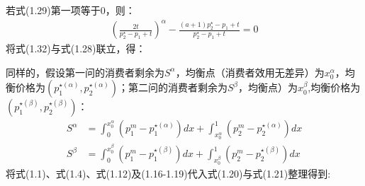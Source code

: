 若式(1.29)第一项等于0，则：
\begin{align}
    (\frac{2t}{p_2^{\star}-p_1+t})^{\alpha}-\frac{(a+1)p_2^{\star}-p_1+t}{p_2^{\star}-p_1+t} = 0
\end{align}
将式(1.32)与式(1.28)联立，得：



同样的，假设第一问的消费者剩余为$S^{\alpha}$，均衡点（消费者效用无差异）为$x_0^{\alpha}$，均衡价格为$(p_1^{\star(\alpha)},p_2^{\star(\alpha)})$；第二问的消费者剩余为$S^{\beta}$，均衡点）为$x_0^{\beta}$,均衡价格为$(p_1^{\star(\beta)},p_2^{\star(\beta)})$：
\begin{align}
    S^{\alpha} &= \int_0^{x_0^{\alpha}}(p_1^m-p_1^{\star(\alpha)})dx+\int_{x_0^{\alpha}}^{1}(p_2^m-p_2^{\star(\alpha)})dx \\
    S^{\beta} &= \int_0^{x_0^{\beta}}(p_1^m-p_1^{\star(\beta)})dx+\int_{x_0^{\beta}}^{1}(p_2^m-p_2^{\star(\beta)})dx 
\end{align}
将式(1.1)、式(1.4)、式(1.12)及(1.16-1.19)代入式(1.20)与式(1.21)整理得到: